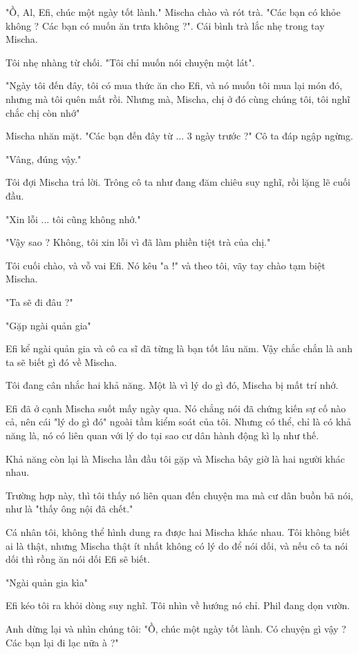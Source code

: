 "Ồ, Al, Efi, chúc một ngày tốt lành." Mischa chào và rót trà. "Các bạn có khỏe không ? Các bạn có muốn ăn trưa không ?". Cái bình trà lắc nhẹ trong tay Mischa.

Tôi nhẹ nhàng từ chối. "Tôi chỉ muốn nói chuyện một lát".

"Ngày tôi đến đây, tôi có mua thức ăn cho Efi, và nó muốn tôi mua lại món đó, nhưng mà tôi quên mất rồi. Nhưng mà, Mischa, chị ở đó cùng chúng tôi, tôi nghĩ chắc chị còn nhớ"

Mischa nhăn mặt. "Các bạn đến đây từ ... 3 ngày trước ?" Cô ta đáp ngập ngừng.

"Vâng, đúng vậy."

Tôi đợi Mischa trả lời. Trông cô ta như đang đăm chiêu suy nghĩ, rồi lặng lẽ cuối đầu.

"Xin lỗi ... tôi cũng không nhớ."

"Vậy sao ? Không, tôi xin lỗi vì đã làm phiền tiệt trà của chị."

Tôi cuối chào, và vỗ vai Efi. Nó kêu "a !" và theo tôi, vãy tay chào tạm biệt Mischa.

"Ta sẽ đi đâu ?"

"Gặp ngài quản gia"

Efi kể ngài quản gia và cô ca sĩ đã từng là bạn tốt lâu năm. Vậy chắc chắn là anh ta sẽ biết gì đó về Mischa.

Tôi đang cân nhắc hai khả năng. Một là vì lý do gì đó, Mischa bị mất trí nhớ.

Efi đã ở cạnh Mischa suốt mấy ngày qua. Nó chẳng nói đã chứng kiến sự cố nào cả, nên cái "lý do gì đó" ngoài tầm kiểm soát của tôi. Nhưng có thể, chỉ là có khả năng là, nó có liên quan với lý do tại sao cư dân hành động kì lạ như thế.

Khả năng còn lại là Mischa lần đầu tôi gặp và Mischa bây giờ là hai người khác nhau.

Trường hợp này, thì tôi thấy nó liên quan đến chuyện ma mà cư dân buồn bã nói, như là "thấy ông nội đã chết."

Cá nhân tôi, không thể hình dung ra được hai Mischa khác nhau. Tôi không biết ai là thật, nhưng Mischa thật ít nhất không có lý do để nói dối, và nếu cô ta nói dối thì rồng ăn nói dối Efi sẽ biết.

"Ngài quản gia kìa"

Efi kéo tôi ra khỏi dòng suy nghĩ. Tôi nhìn về hướng nó chỉ. Phil đang dọn vườn.

Anh dừng lại và nhìn chúng tôi: "Ồ, chúc một ngày tốt lành. Có chuyện gì vậy ? Các bạn lại đi lạc nữa à ?"

